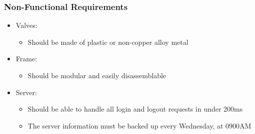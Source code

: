 \begin{frame}
    \frametitle{Non-Functional Requirements}
    \begin{itemize}
        \item {\large Valves:}
        \begin{itemize}
            \item Should be made of plastic or non-copper alloy metal
        \end{itemize}
        \item {\large Frame:}
        \begin{itemize}
            \item Should be modular and easily disassemblable
        \end{itemize}
        \item {\large Server:}
        \begin{itemize}
            \item Should be able to handle all login and logout requests in 
            under 200ms
            \item The server information must be backed up every Wednesday, at
            0900AM
        \end{itemize}
    \end{itemize}
\end{frame}
